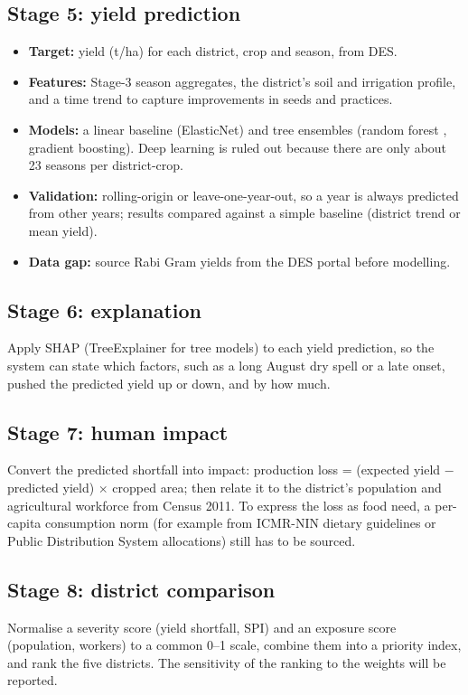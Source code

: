 \subsection{Stage 5: yield prediction}
\begin{itemize}
	\item \textbf{Target:} yield (t/ha) for each district, crop and season, from DES.
	\item \textbf{Features:} Stage-3 season aggregates, the district's soil and irrigation profile, and a time trend to capture improvements in seeds and practices.
	\item \textbf{Models:} a linear baseline (ElasticNet) and tree ensembles (random forest \cite{breiman2001random}, gradient boosting). Deep learning is ruled out because there are only about 23 seasons per district-crop.
	\item \textbf{Validation:} rolling-origin or leave-one-year-out, so a year is always predicted from other years; results compared against a simple baseline (district trend or mean yield).
	\item \textbf{Data gap:} source Rabi Gram yields from the DES portal before modelling.
\end{itemize}

\subsection{Stage 6: explanation}
Apply SHAP \cite{lundberg2017unified} (TreeExplainer for tree models) to each yield prediction, so the system can state which factors, such as a long August dry spell or a late onset, pushed the predicted yield up or down, and by how much.

\subsection{Stage 7: human impact}
Convert the predicted shortfall into impact: production loss = (expected yield $-$ predicted yield) $\times$ cropped area; then relate it to the district's population and agricultural workforce from Census 2011. To express the loss as food need, a per-capita consumption norm (for example from ICMR-NIN dietary guidelines or Public Distribution System allocations) still has to be sourced.

\subsection{Stage 8: district comparison}
Normalise a severity score (yield shortfall, SPI) and an exposure score (population, workers) to a common 0--1 scale, combine them into a priority index, and rank the five districts. The sensitivity of the ranking to the weights will be reported.

